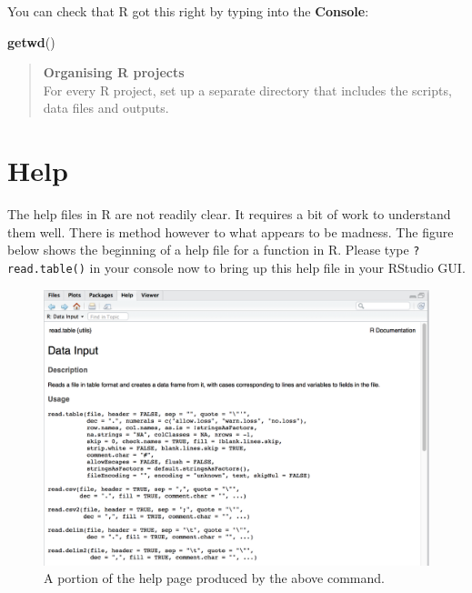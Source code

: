\documentclass[]{book}
\newenvironment{Shaded}{\begin{snugshade}}{\end{snugshade}}
\newcommand{\KeywordTok}[1]{\textcolor[rgb]{0.13,0.29,0.53}{\textbf{#1}}}
\newcommand{\NormalTok}[1]{#1}
\theoremstyle{definition}
\theoremstyle{definition}
\theoremstyle{definition}
\theoremstyle{remark}
\begin{document}
You can check that R got this right by typing into the \textbf{Console}:

\begin{Shaded}
\begin{Highlighting}[]
\KeywordTok{getwd}\NormalTok{()}
\end{Highlighting}
\end{Shaded}

\begin{quote}
\textbf{Organising R projects}\\
For every R project, set up a separate directory that includes the
scripts, data files and outputs.
\end{quote}

\section{Help}\label{help}

The help files in R are not readily clear. It requires a bit of work to
understand them well. There is method however to what appears to be
madness. The figure below shows the beginning of a help file for a
function in R. Please type \texttt{?read.table()} in your console now to
bring up this help file in your RStudio GUI.

\begin{figure}

{\centering \includegraphics[width=1\linewidth]{figures/help_output} 

}

\caption{A portion of the help page produced by the above command.}\label{fig:help-output}
\end{figure}
\end{document}
